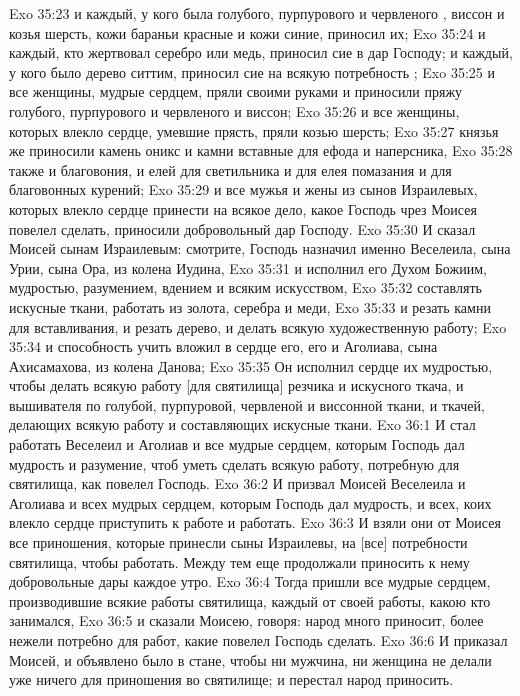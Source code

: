 \vs Exo 35:23 и каждый, у кого была  голубого, пурпурового и червленого , виссон и козья шерсть, кожи бараньи красные и кожи синие, приносил их;
\vs Exo 35:24 и каждый, кто жертвовал серебро или медь, приносил сие в дар Господу; и каждый, у кого было дерево ситтим, приносил сие на всякую потребность ;
\vs Exo 35:25 и все женщины, мудрые сердцем, пряли своими руками и приносили пряжу голубого, пурпурового и червленого  и виссон;
\vs Exo 35:26 и все женщины, которых влекло сердце, умевшие прясть, пряли козью шерсть;
\vs Exo 35:27 князья же приносили камень оникс и камни вставные для ефода и наперсника,
\vs Exo 35:28 также и благовония, и елей для светильника и для  елея помазания и для благовонных курений;
\vs Exo 35:29 и все мужья и жены из сынов Израилевых, которых влекло сердце принести на всякое дело, какое Господь чрез Моисея повелел сделать, приносили добровольный дар Господу.
\rsbpar\vs Exo 35:30 И сказал Моисей сынам Израилевым: смотрите, Господь назначил именно Веселеила, сына Урии, сына Ора, из колена Иудина,
\vs Exo 35:31 и исполнил его Духом Божиим, мудростью, разумением, вдением и всяким искусством,
\vs Exo 35:32 составлять искусные ткани, работать из золота, серебра и меди,
\vs Exo 35:33 и резать камни для вставливания, и резать дерево, и делать всякую художественную работу;
\vs Exo 35:34 и способность учить  вложил в сердце его, его и Аголиава, сына Ахисамахова, из колена Данова;
\vs Exo 35:35 Он исполнил сердце их мудростью, чтобы делать всякую работу [для святилища] резчика и искусного ткача, и вышивателя по голубой, пурпуровой, червленой и виссонной ткани, и ткачей, делающих всякую работу и составляющих искусные ткани.
\vs Exo 36:1 И стал работать Веселеил и Аголиав и все мудрые сердцем, которым Господь дал мудрость и разумение, чтоб уметь сделать всякую работу, потребную для святилища, как повелел Господь.
\vs Exo 36:2 И призвал Моисей Веселеила и Аголиава и всех мудрых сердцем, которым Господь дал мудрость, и всех, коих влекло сердце приступить к работе и работать.
\vs Exo 36:3 И взяли они от Моисея все приношения, которые принесли сыны Израилевы, на [все] потребности святилища, чтобы работать. Между тем еще продолжали приносить к нему добровольные дары каждое утро.
\vs Exo 36:4 Тогда пришли все мудрые сердцем, производившие всякие работы святилища, каждый от своей работы, какою кто занимался,
\vs Exo 36:5 и сказали Моисею, говоря: народ много приносит, более нежели потребно для работ, какие повелел Господь сделать.
\vs Exo 36:6 И приказал Моисей, и объявлено было в стане, чтобы ни мужчина, ни женщина не делали уже ничего для приношения во святилище; и перестал народ приносить.
